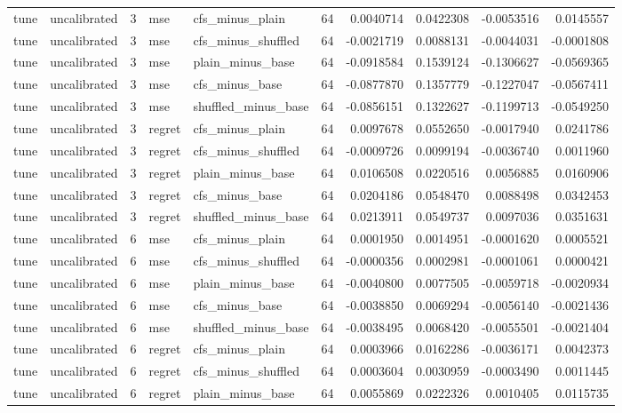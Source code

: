 \begin{tabular}{llrllrrrrr}
tune & uncalibrated & 3 & mse & cfs_minus_plain & 64 & 0.0040714 & 0.0422308 & -0.0053516 & 0.0145557 \\
tune & uncalibrated & 3 & mse & cfs_minus_shuffled & 64 & -0.0021719 & 0.0088131 & -0.0044031 & -0.0001808 \\
tune & uncalibrated & 3 & mse & plain_minus_base & 64 & -0.0918584 & 0.1539124 & -0.1306627 & -0.0569365 \\
tune & uncalibrated & 3 & mse & cfs_minus_base & 64 & -0.0877870 & 0.1357779 & -0.1227047 & -0.0567411 \\
tune & uncalibrated & 3 & mse & shuffled_minus_base & 64 & -0.0856151 & 0.1322627 & -0.1199713 & -0.0549250 \\
tune & uncalibrated & 3 & regret & cfs_minus_plain & 64 & 0.0097678 & 0.0552650 & -0.0017940 & 0.0241786 \\
tune & uncalibrated & 3 & regret & cfs_minus_shuffled & 64 & -0.0009726 & 0.0099194 & -0.0036740 & 0.0011960 \\
tune & uncalibrated & 3 & regret & plain_minus_base & 64 & 0.0106508 & 0.0220516 & 0.0056885 & 0.0160906 \\
tune & uncalibrated & 3 & regret & cfs_minus_base & 64 & 0.0204186 & 0.0548470 & 0.0088498 & 0.0342453 \\
tune & uncalibrated & 3 & regret & shuffled_minus_base & 64 & 0.0213911 & 0.0549737 & 0.0097036 & 0.0351631 \\
tune & uncalibrated & 6 & mse & cfs_minus_plain & 64 & 0.0001950 & 0.0014951 & -0.0001620 & 0.0005521 \\
tune & uncalibrated & 6 & mse & cfs_minus_shuffled & 64 & -0.0000356 & 0.0002981 & -0.0001061 & 0.0000421 \\
tune & uncalibrated & 6 & mse & plain_minus_base & 64 & -0.0040800 & 0.0077505 & -0.0059718 & -0.0020934 \\
tune & uncalibrated & 6 & mse & cfs_minus_base & 64 & -0.0038850 & 0.0069294 & -0.0056140 & -0.0021436 \\
tune & uncalibrated & 6 & mse & shuffled_minus_base & 64 & -0.0038495 & 0.0068420 & -0.0055501 & -0.0021404 \\
tune & uncalibrated & 6 & regret & cfs_minus_plain & 64 & 0.0003966 & 0.0162286 & -0.0036171 & 0.0042373 \\
tune & uncalibrated & 6 & regret & cfs_minus_shuffled & 64 & 0.0003604 & 0.0030959 & -0.0003490 & 0.0011445 \\
tune & uncalibrated & 6 & regret & plain_minus_base & 64 & 0.0055869 & 0.0222326 & 0.0010405 & 0.0115735 \\

\end{tabular}
